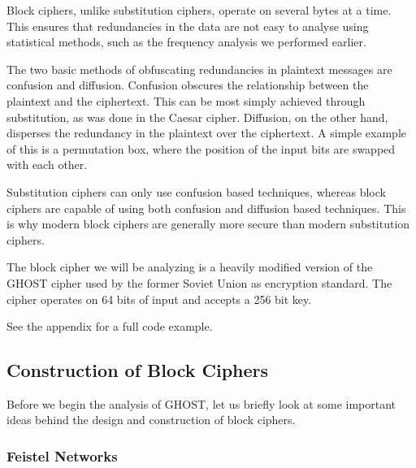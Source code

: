 \documentclass[12pt, a4paper, final]{report}
\begin{document}
Block ciphers, unlike substitution ciphers, operate on several bytes at
a time. This ensures that redundancies in the data are not easy
to analyse using statistical methods, such as the frequency analysis
we performed earlier.

The two basic methods of obfuscating redundancies in plaintext
messages are confusion and diffusion. Confusion obscures the relationship
between the plaintext and the ciphertext. This can be most simply achieved
through substitution, as was done in the Caesar cipher. Diffusion, on the
other hand, disperses the redundancy in the plaintext over the ciphertext.
A simple example of this is a permutation box, where the position of the
input bits are swapped with each other.

Substitution ciphers can only use confusion based techniques, whereas block
ciphers are capable of using both confusion and diffusion based techniques.
This is why modern block ciphers are generally more secure than modern
substitution ciphers.

The block cipher we will be analyzing is a heavily modified version of the
GHOST cipher used by the former Soviet Union as encryption standard. The cipher operates on 64 bits of input and accepts a 256 bit key.

See the appendix for a full code example.

\subsection{Construction of Block Ciphers}

Before we begin the analysis of GHOST, let us briefly look at some important
ideas behind the design and construction of block ciphers.

\subsubsection{Feistel Networks}
\end{document}
